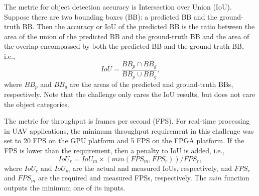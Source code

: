 \documentclass[10pt,journal,compsoc]{IEEEtran}
\begin{document}
The metric for object detection accuracy is Intersection over Union (IoU).
Suppose there are two bounding boxes (BB): a predicted BB and the ground-truth BB.
Then the accuracy or IoU of the predicted BB is the ratio between the area of the union of the predicted BB and the ground-truth BB and the area of the overlap encompassed by both the predicted BB and the ground-truth BB, i.e.,
\begin{equation}\label{distance}
IoU = \frac{BB_{p}\cap BB_{g}}{BB_{p}\cup BB_{g}},
\end{equation}
where $BB_{p}$ and $BB_{g}$ are the areas of the predicted and ground-truth BBs, respectively.
Note that the challenge only cares the IoU results, but does not care the object categories.

The metric for throughput is frames per second (FPS).
For real-time processing in UAV applications, the minimum throughput requirement in this challenge was set to 20 FPS on the GPU platform and 5 FPS on the FPGA platform.
If the FPS is lower than the requirement, then a penalty to IoU is added, i.e.,
\begin{equation}\label{penalty}
IoU_{r} = IoU_{m}\times (min(FPS_{m}, FPS_{r}))/FPS_{r},
\end{equation}
where $IoU_{r}$ and $IoU_{m}$ are the actual and measured IoUs, respectively, and $FPS_{r}$ and $FPS_{m}$ are the required and measured FPSs, respectively.
The $min$ function outputs the minimum one of its inputs.
\end{document}

